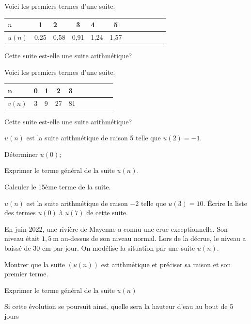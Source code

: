 \documentclass[11pt,a4paper]{article}  %
\begin{document}
\begin{enumMet}
	\item {} Voici les premiers termes d'une suite.
	
\begin{tabular}{|Xc|Xc|Xc|Xc|Xc|Xc|}
	\hline$n$ & 1 & 2 & 3 & 4 & 5 \\
	\hline$u(n)$ & 0,25 & 0,58 & 0,91 & 1,24 & 1,57 \\
	\hline
\end{tabular}

Cette suite est-elle une suite arithmétique?

\item Voici les premiers termes d'une suite.

\begin{tabular}{|Xc|Xc|Xc|Xc|Xc|}
	\hline $\boldsymbol{n}$ & 0 & 1 & 2 & 3 \\
	\hline$v(n)$ & 3 & 9 & 27 & 81 \\
	\hline
\end{tabular}

Cette suite est-elle une suite arithmétique?
\end{enumMet}



$u(n)$ est la suite arithmétique de raison 5 telle que $u(2)=-1$.
\begin{enumMet}
	\item Déterminer $u(0)$;
	\item Exprimer le terme général de la suite $u(n)$.
	\item Calculer le 15ème terme de la suite.
\end{enumMet}

$u(n)$ est la suite arithmétique de raison $-2$ telle que $u(3)=10$.
Écrire la liste des termes $u(0)$ à $u(7)$ de cette suite.



En juin 2022, une rivière de Mayenne a connu une crue exceptionnelle.
Son niveau était $1,5 \mathrm{~m}$ au-dessus de son niveau normal.
Lors de la décrue, le niveau a baissé de 30 cm par jour. On modélise la situation par une suite $u(n)$.
\begin{enumMet}
	\item Montrer que la suite $\left(u(n)\right)$ est arithmétique et préciser sa raison et son premier terme.
	\item Exprimer le terme général de la suite $u(n)$
	\item Si cette évolution se poursuit ainsi, quelle sera la hauteur d'eau au bout de 5 jours
\end{enumMet}
\end{document}
